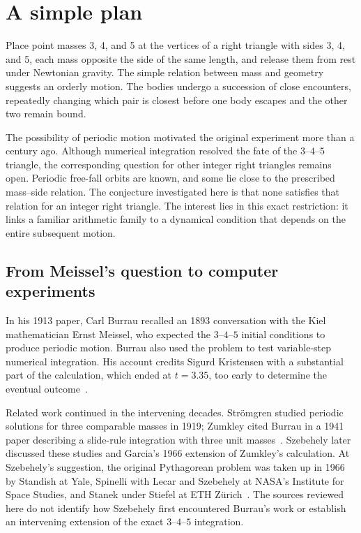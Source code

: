 \section{A simple plan}\label{sec:intro}

Place point masses 3, 4, and 5 at the vertices of a right triangle with
sides 3, 4, and 5, each mass opposite the side of the same length, and
release them from rest under Newtonian gravity. The simple relation between
mass and geometry suggests an orderly motion. The bodies undergo
a succession of close encounters, repeatedly changing which pair is
closest before one body escapes and the other two remain bound.

The possibility of periodic motion motivated the original experiment more
than a century ago. Although numerical integration resolved the fate of
the $3$--$4$--$5$ triangle, the corresponding question for other integer
right triangles remains open. Periodic free-fall orbits are known, and
some lie close to the prescribed mass--side relation. The conjecture
investigated here is that none satisfies that relation for an integer
right triangle. The interest lies in this exact restriction: it links a
familiar arithmetic family to a dynamical condition that depends on the
entire subsequent motion.

\subsection{From Meissel's question to computer experiments}

In his 1913 paper, Carl Burrau recalled an 1893 conversation with the
Kiel mathematician Ernst Meissel, who expected the $3$--$4$--$5$ initial
conditions to produce periodic motion. Burrau also used the problem to
test variable-step numerical integration. His account credits Sigurd
Kristensen with a substantial part of the calculation, which ended at
$t=3.35$, too early to determine the eventual outcome~\cite{Burrau1913,SP1967}.

Related work continued in the intervening decades. Str\"omgren studied
periodic solutions for three comparable masses in 1919; Zumkley cited
Burrau in a 1941 paper describing a slide-rule integration with three
unit masses~\cite{Stromgren1919,Zumkley1941}. Szebehely later discussed
these studies and Garcia's 1966 extension of Zumkley's calculation.
At Szebehely's suggestion, the original Pythagorean problem was taken up
in 1966 by Standish at Yale, Spinelli with Lecar and Szebehely at NASA's
Institute for Space Studies, and Stanek under Stiefel at ETH
Z\"urich~\cite{Szebehely1967}. The sources reviewed here do not identify
how Szebehely first encountered Burrau's work or establish an intervening
extension of the exact $3$--$4$--$5$ integration.

